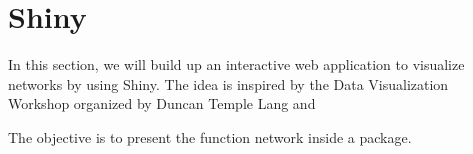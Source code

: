 \section{Shiny}

In this section, we will build up an interactive web application to visualize networks by using Shiny. The idea is inspired by the Data Visualization Workshop organized by Duncan Temple Lang and 

The objective is to present the function network inside a package.